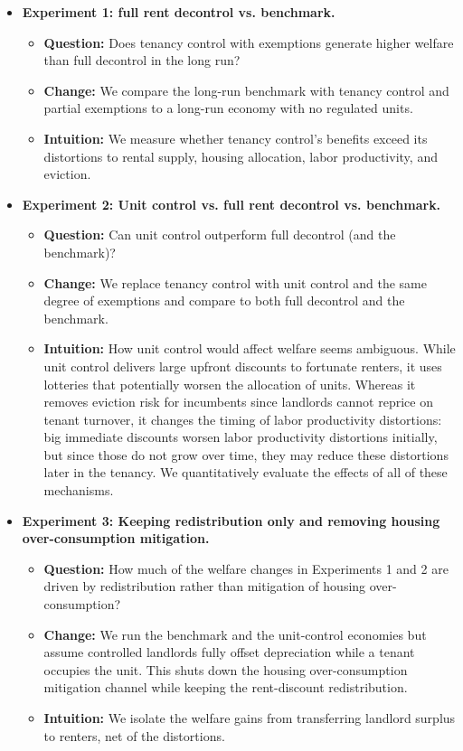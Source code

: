 \documentclass[parskip=full]{article}
\begin{document}
\begin{itemize}
  \item \textbf{Experiment 1: full rent decontrol vs. benchmark.} 
  \begin{itemize}
      \item \textbf{Question:} Does tenancy control with exemptions generate higher welfare than full decontrol in the long run?
      \item \textbf{Change:} We compare the long-run benchmark with tenancy control and partial exemptions to a long-run economy with no regulated units.
      \item \textbf{Intuition:} We measure whether tenancy control’s benefits exceed its distortions to rental supply, housing allocation, labor productivity, and eviction.
  \end{itemize} 

  \item \textbf{Experiment 2: Unit control vs. full rent decontrol vs. benchmark.}
  \begin{itemize}
      \item \textbf{Question:} Can unit control outperform full decontrol (and the benchmark)?
      \item \textbf{Change:} We replace tenancy control with unit control and the same degree of exemptions and compare to both full decontrol and the benchmark.
      \item \textbf{Intuition:} How unit control would affect welfare seems ambiguous. While unit control delivers large upfront discounts to fortunate renters, it uses lotteries that potentially worsen the allocation of units. Whereas it removes eviction risk for incumbents since landlords cannot reprice on tenant turnover, it changes the timing of labor productivity distortions: big immediate discounts worsen labor productivity distortions initially, but since those do not grow over time, they may reduce these distortions later in the tenancy. We quantitatively evaluate the effects of all of these mechanisms.
  \end{itemize}

  \item \textbf{Experiment 3: Keeping redistribution only and removing housing over-consumption mitigation.}
  \begin{itemize}
      \item \textbf{Question:} How much of the welfare changes in Experiments 1 and 2 are driven by redistribution rather than mitigation of housing over-consumption?
      \item \textbf{Change:} We run the benchmark and the unit-control economies but assume controlled landlords fully offset depreciation while a tenant occupies the unit. This shuts down the housing over-consumption mitigation channel while keeping the rent-discount redistribution.
      \item \textbf{Intuition:} We isolate the welfare gains from transferring landlord surplus to renters, net of the distortions.
  \end{itemize}


\end{itemize}
\end{document}
